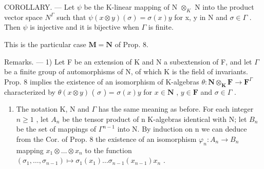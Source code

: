 COROLLARY. --- Let \(\psi\) be the K-linear mapping of N \(\otimes_{K}\) N into the product vector space \(N^{\Gamma}\) such that \(\psi(x \otimes y) (\sigma) = \sigma(x)y\) for x, y in N and \(\sigma \in \Gamma\) . Then \(\psi\) is injective and it is bijective when \(\Gamma\) is finite.

This is the particular case \(\mathbf{M} = \mathbf{N}\) of Prop. 8.

Remarks. --- 1) Let F be an extension of K and N a subextension of F, and let \(\Gamma\) be a finite group of automorphisms of N, of which K is the field of invariants. Prop. 8 implies the existence of an isomorphism of K-algebras \(\theta: \mathbf{N} \otimes_{\mathbf{K}} \mathbf{F} \to \mathbf{F}^{\Gamma}\) characterized by \(\theta(x \otimes y)\) ( \(\sigma\) ) = \(\sigma(x)y\) for \(x \in \mathbf{N}\) , \(y \in \mathbf{F}\) and \(\sigma \in \Gamma\) .

\begin{enumerate}
\def\labelenumi{\arabic{enumi})}
\setcounter{enumi}{1}
\tightlist
\item
  The notation K, N and \(\Gamma\) has the same meaning as before. For each integer \(n \geqslant 1\) , let \(A_{n}\) be the tensor product of n K-algebras identical with N; let \(B_{n}\) be the set of mappings of \(\Gamma^{n-1}\) into N. By induction on n we can deduce from the Cor. of Prop. 8 the existence of an isomorphism \(\varphi_{n}: A_{n} \to B_{n}\) mapping \(x_{1} \otimes \ldots \otimes x_{n}\) to the function \((\sigma_{1}, \ldots, \sigma_{n-1}) \mapsto \sigma_{1}(x_{1}) \ldots \sigma_{n-1}(x_{n-1}) x_{n}\) .
\end{enumerate}

